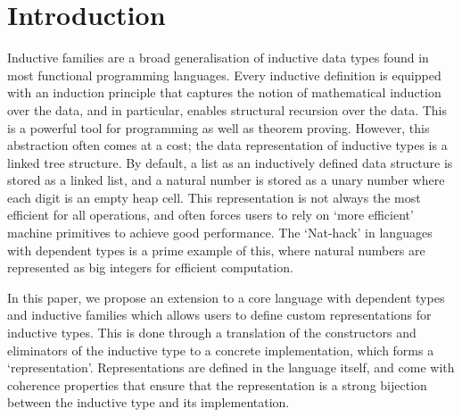 \section{Introduction}\label{sec:intro}

Inductive families are a broad generalisation of inductive data types found in
most functional programming languages. Every inductive definition is equipped
with an induction principle that captures the notion of mathematical induction
over the data, and in particular, enables structural recursion over the data.
This is a powerful tool for programming as well as theorem proving. However,
this abstraction often comes at a cost; the data representation of inductive
types is a linked tree structure. By default, a list as an inductively defined
data structure is stored as a linked list, and a natural number is stored as a
unary number where each digit is an empty heap cell. This representation is not
always the most efficient for all operations, and often forces users to rely on
`more efficient' machine primitives to achieve good performance. The `Nat-hack'
in languages with dependent types is a prime example of this, where natural
numbers are represented as big integers for efficient computation.

In this paper, we propose an extension to a core language with dependent types
and inductive families which allows users to define custom representations for
inductive types. This is done through a translation of the constructors and
eliminators of the inductive type to a concrete implementation, which forms a
`representation'. Representations are defined in the language itself, and come
with coherence properties that ensure that the representation is a strong
bijection between the inductive type and its implementation.




